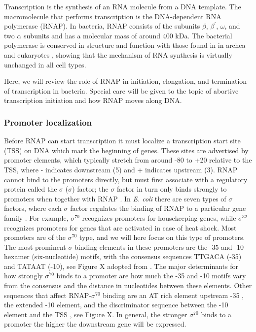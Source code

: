 %
Transcription is the synthesis of an RNA molecule from a DNA template. The
macromolecule that performs transcription is the DNA-dependent RNA polymerase
(RNAP). In bacteria, RNAP consists of the subunits $\beta$, $\beta^{\prime}$,
$\omega$, and two $\alpha$ subunits and has a molecular mass of around 400 kDa.
The bacterial polymerase is conserved in structure and function with those
found in in archea and eukaryotes \cite{borukhov_rna_2008}, showing that the
mechanism of RNA synthesis is virtually unchanged in all cell types.

Here, we will review the role of RNAP in initiation, elongation, and
termination of transcription in bacteria. Special care will be given to the
topic of abortive transcription initiation and how RNAP moves along DNA.

\subsubsection{Promoter localization}
Before RNAP can start transcription it must localize a transcription start site
(TSS) on DNA which mark the beginning of genes. These sites are advertised by
promoter elements, which typically stretch from around -80 to +20 relative to
the TSS, where - indicates downstream (5\p) and + indicates upstream (3\p).
RNAP cannot bind to the promoters directly, but must first associate with a
regulatory protein called the $\sigma$ ($\sigma$) factor; the $\sigma$ factor in turn
only binds strongly to promoters when together with RNAP \cite{paget_70_2003}.
In \textit{E. coli} there are seven types of $\sigma$ factors, where each $\sigma$
factor regulates the binding of RNAP to a particular gene family
\cite{osterberg_regulation_2011}. For example, $\sigma^{70}$ recognizes
promoters for housekeeping genes, while $\sigma^{32}$ recognizes promoters for
genes that are activated in case of heat shock. Most promoters are of the
$\sigma^{70}$ type, and we will here focus on this type of promoters. The most
prominent $\sigma$-binding elements in these promoters are the -35 and -10
hexamer (six-nucleotide) motifs, with the consensus sequences TTGACA (-35) and
TATAAT (-10), see Figure X adopted from \cite{haugen_fine_2008}. The major
determinants for how strongly $\sigma^{70}$ binds to a promoter are how much
the -35 and -10 motifs vary from the consensus and the distance in nucleotides
between these elements. Other sequences that affect RNAP-$\sigma^{70}$ binding
are an AT rich element upstream -35 \cite{ross_third_1993}, the extended -10
element, and the discriminator sequence between the -10 element and the TSS
\cite{haugen_fine_2008}, see Figure X. In general, the stronger $\sigma^{70}$
binds to a promoter the higher the downstream gene will be expressed.

